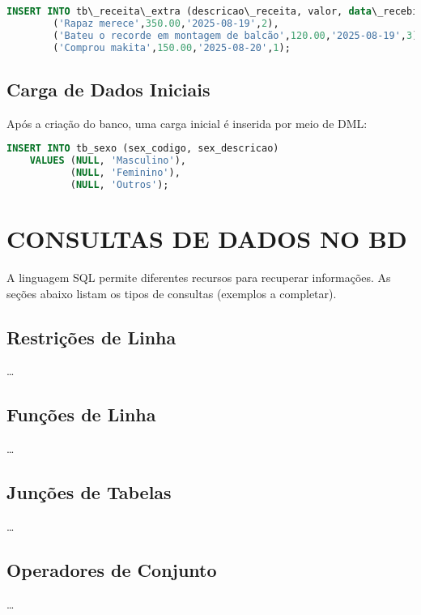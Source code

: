 \documentclass[
12pt,
a4paper,
semrecuonosumario,
sumario = abnt-6027-2012]{report}
\begin{document}
    \begin{lstlisting}[language=SQL,caption={DML -- Tabela \texttt{tb\_receita\_extra}}]
        INSERT INTO tb\_receita\_extra (descricao\_receita, valor, data\_recebimento, id\_funcionario) VALUES
        ('Rapaz merece',350.00,'2025-08-19',2),
        ('Bateu o recorde em montagem de balcão',120.00,'2025-08-19',3),
        ('Comprou makita',150.00,'2025-08-20',1);
    \end{lstlisting}


    \section{Carga de Dados Iniciais}\label{sec:carga}
    Após a criação do banco, uma carga inicial é inserida por meio de DML:
    
    \begin{lstlisting}[language=SQL,caption={DML -- Carga inicial na tabela \texttt{tb\_sexo}}]
    INSERT INTO tb_sexo (sex_codigo, sex_descricao)
    VALUES (NULL, 'Masculino'),
           (NULL, 'Feminino'),
           (NULL, 'Outros');
    \end{lstlisting}

\chapter{CONSULTAS DE DADOS NO BD}\label{chap:consultas}
A linguagem SQL permite diferentes recursos para recuperar informações.
As seções abaixo listam os tipos de consultas (exemplos a completar).
    
    \section{Restrições de Linha}
    \dots
    
    \section{Funções de Linha}
    \dots
    
    \section{Junções de Tabelas}
    \dots
    
    \section{Operadores de Conjunto}
    \dots
    
\end{document}
